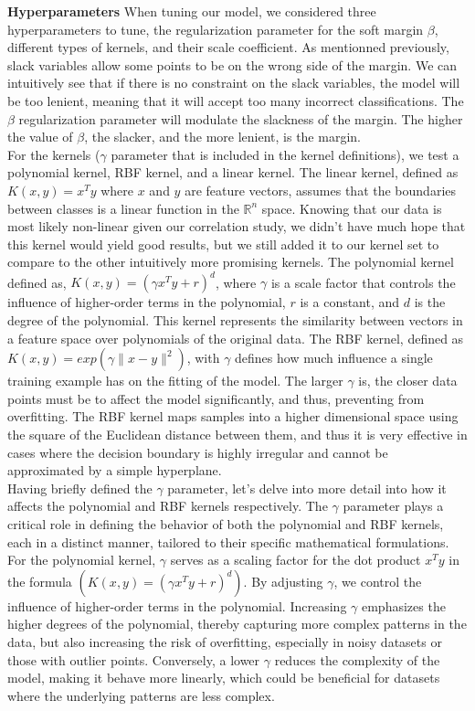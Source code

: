 \documentclass[twocolumn]{article}
\newcommand{\R}{\mathbb{R}}
\begin{document}
\textbf{Hyperparameters}
When tuning our model, we considered three hyperparameters to tune, the regularization parameter for the soft margin $\beta$, different types of kernels, and their scale coefficient. As mentionned previously, slack variables allow some points to be on the wrong side of the margin. We can intuitively see that if there is no constraint on the slack variables, the model will be too lenient, meaning that it will accept too many incorrect classifications. The $\beta$ regularization parameter will modulate the slackness of the margin. The higher the value of $\beta$, the slacker, and the more lenient, is the margin. \\
For the kernels ($\gamma$ parameter that is included in the kernel definitions), we test a polynomial kernel, RBF kernel, and a linear kernel. The linear kernel, defined as $K(x, y) = x^T y$ where $x$ and $y$ are feature vectors, assumes that the boundaries between classes is a linear function in the $\R^n$ space. Knowing that our data is most likely non-linear given our correlation study, we didn't have much hope that this kernel would yield good results, but we still added it to our kernel set to compare to the other intuitively more promising kernels. The polynomial kernel defined as, $K(x, y) = (\gamma x^T y + r )^d$, where $\gamma$ is a scale factor that controls the influence of higher-order terms in the polynomial, $r$ is a constant, and $d$ is the degree of the polynomial. This kernel represents the similarity between vectors in a feature space over polynomials of the original data. The RBF kernel, defined as $K(x, y) = exp(\gamma \| x - y \|^2)$, with $\gamma$ defines how much influence a single training example has on the fitting of the model. The larger $\gamma$ is, the closer data points must be to affect the model significantly, and thus, preventing from overfitting. The RBF kernel maps samples into a higher dimensional space using the square of the Euclidean distance between them, and thus it is very effective in cases where the decision boundary is highly irregular and cannot be approximated by a simple hyperplane. \\
Having briefly defined the $\gamma$ parameter, let's delve into more detail into how it affects the polynomial and RBF kernels respectively. The $\gamma$ parameter plays a critical role in defining the behavior of both the polynomial and RBF kernels, each in a distinct manner, tailored to their specific mathematical formulations.
For the polynomial kernel, $\gamma$ serves as a scaling factor for the dot product \(x^T y\) in the formula $(K(x, y) = (\gamma x^T y + r)^d)$. By adjusting $\gamma$, we control the influence of higher-order terms in the polynomial. Increasing $\gamma$ emphasizes the higher degrees of the polynomial, thereby capturing more complex patterns in the data, but also increasing the risk of overfitting, especially in noisy datasets or those with outlier points. Conversely, a lower $\gamma$ reduces the complexity of the model, making it behave more linearly, which could be beneficial for datasets where the underlying patterns are less complex.
\end{document}
